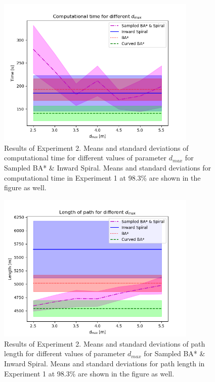 \begin{figure}
\centering
    \includegraphics[width=0.85\textwidth]{figures/exp2_time.png}
    \caption{Results of Experiment 2. Means and standard deviations of computational time for different values of parameter $d_{max}$ for Sampled BA* \& Inward Spiral. Means and standard deviations for computational time in Experiment 1 at 98.3\% are shown in the figure as well.}
    \label{fig:exp2_time}
\end{figure}

\begin{figure}
\centering
    \includegraphics[width=0.85\textwidth]{figures/exp2_length.png}
    \caption{Results of Experiment 2. Means and standard deviations of path length for different values of parameter $d_{max}$ for Sampled BA* \& Inward Spiral. Means and standard deviations for path length in Experiment 1 at 98.3\% are shown in the figure as well.}
    \label{fig:exp2_length}
\end{figure}


